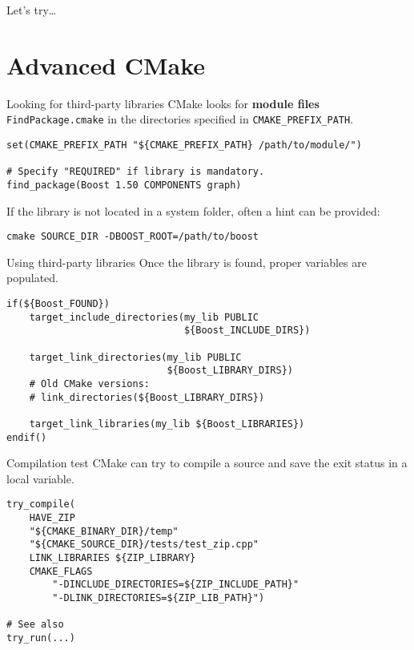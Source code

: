 \documentclass[aspectratio=169,11pt]{beamer}
\begin{document}
\begin{frame}[focus]{}
Let's try\dots
\end{frame}

\section{Advanced CMake}
\begin{frame}[fragile]{Looking for third-party libraries}
CMake looks for \textbf{module files} \texttt{FindPackage.cmake} in the directories specified in \texttt{CMAKE\_PREFIX\_PATH}.
\vfill
\begin{verbatim}
set(CMAKE_PREFIX_PATH "${CMAKE_PREFIX_PATH} /path/to/module/")

# Specify "REQUIRED" if library is mandatory.
find_package(Boost 1.50 COMPONENTS graph)
\end{verbatim}
\vfill
If the library is not located in a system folder, often a hint can be provided:
\begin{verbatim}
cmake SOURCE_DIR -DBOOST_ROOT=/path/to/boost
\end{verbatim}
\end{frame}

\begin{frame}[fragile]{Using third-party libraries}
Once the library is found, proper variables are populated.
\begin{verbatim}
if(${Boost_FOUND})
    target_include_directories(my_lib PUBLIC
                               ${Boost_INCLUDE_DIRS})
    
    target_link_directories(my_lib PUBLIC
                            ${Boost_LIBRARY_DIRS})
    # Old CMake versions:
    # link_directories(${Boost_LIBRARY_DIRS})
    
    target_link_libraries(my_lib ${Boost_LIBRARIES})
endif()
\end{verbatim}
\end{frame}

\begin{frame}[fragile]{Compilation test}
CMake can try to compile a source and save the exit status in a local variable.
\begin{verbatim}
try_compile(
    HAVE_ZIP
    "${CMAKE_BINARY_DIR}/temp"
    "${CMAKE_SOURCE_DIR}/tests/test_zip.cpp"
    LINK_LIBRARIES ${ZIP_LIBRARY}
    CMAKE_FLAGS
        "-DINCLUDE_DIRECTORIES=${ZIP_INCLUDE_PATH}"
        "-DLINK_DIRECTORIES=${ZIP_LIB_PATH}")

# See also
try_run(...)
\end{verbatim}
\end{frame}
\end{document}
